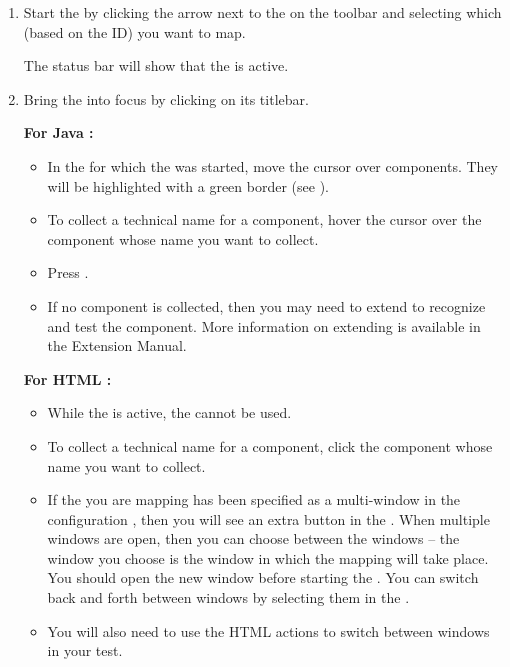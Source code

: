 \begin{enumerate}
\item Start the \gdomm{} by clicking the arrow next to the on the toolbar and selecting which \gdaut{} (based on the \gdaut{} ID) you want to map. 


The status bar will show that the \gdomm{} is active. 
\item Bring the \gdaut{} into focus by clicking on its titlebar. 

\textbf{For Java \gdauts{}:}
\begin{itemize}
\item In the \gdaut{} for which the \gdomm{} was started, move the cursor over components. They will be highlighted with a green border (see ). 
\item To collect a technical name for a component, hover the cursor over the component whose name you want to collect. 
\item Press .
\item If no component is collected, then you may need to extend \app{} to recognize and test the component. More information on extending \app{} is available in the Extension Manual.
\end{itemize}

\textbf{For HTML \gdauts{}:}
\begin{itemize}
\item While the \gdomm{} is active, the \gdaut{} cannot be used. 
\item To collect a technical name for a component, click the component whose name you want to collect. 
\item If the \gdaut{} you are mapping has been specified as a multi-window \gdaut{} in the \gdaut{} configuration , then you will see an extra button in the \gdomeditor{}. When multiple windows are open, then you can choose between the windows -- the window you choose is the window in which the mapping will take place. You should open the new window before starting the \gdomm{}. You can switch back and forth between windows by selecting them in the \gdomeditor{}. 
\item You will also need to use the HTML actions to switch between windows in your test. 
\end{itemize}


\end{enumerate}
